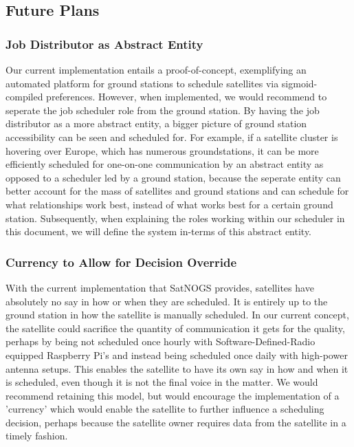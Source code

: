 \documentclass{article}
\begin{document}
\subsection{Future Plans}

\subsubsection{Job Distributor as Abstract Entity}
Our current implementation entails a proof-of-concept, exemplifying an automated platform for ground stations to schedule satellites via sigmoid-compiled preferences. However, when implemented, we would recommend to seperate the job scheduler role from the ground station. By having the job distributor as a more abstract entity, a bigger picture of ground station accessibility can be seen and scheduled for. For example, if a satellite cluster is hovering over Europe, which has numerous groundstations, it can be more efficiently scheduled for one-on-one communication by an abstract entity as opposed to a scheduler led by a ground station, because the seperate entity can better account for the mass of satellites and ground stations and can schedule for what relationships work best, instead of what works best for a certain ground station. Subsequently, when explaining the roles working within our scheduler in this document, we will define the system in-terms of this abstract entity. 

\subsubsection{Currency to Allow for Decision Override}
With the current implementation that SatNOGS provides, satellites have absolutely no say in how or when they are scheduled. It is entirely up to the ground station in how the satellite is manually scheduled. In our current concept, the satellite could sacrifice the quantity of communication it gets for the quality, perhaps by being not scheduled once hourly with Software-Defined-Radio equipped Raspberry Pi's and instead being scheduled once daily with high-power antenna setups. This enables the satellite to have its own say in how and when it is scheduled, even though it is not the final voice in the matter. We would recommend retaining this model, but would encourage the implementation of a 'currency' which would enable the satellite to further influence a scheduling decision, perhaps because the satellite owner requires data from the satellite in a timely fashion.
\end{document}
